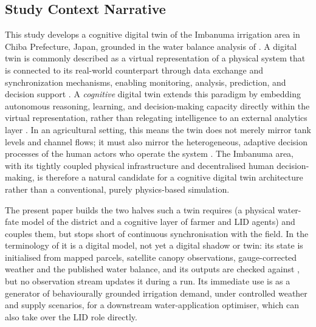 \documentclass{article}
\begin{document}
\subsection{Study Context Narrative}
This study develops a cognitive digital twin of the Imbanuma irrigation area in Chiba Prefecture, Japan, grounded in the water balance analysis of \cite{Okura2025WaterBalance}. A digital twin is commonly described as a virtual representation of a physical system that is connected to its real-world counterpart through data exchange and synchronization mechanisms, enabling monitoring, analysis, prediction, and decision support \cite{Kritzinger2018DigitalTwin, Jones2020DigitalTwin}. A \emph{cognitive} digital twin extends this paradigm by embedding autonomous reasoning, learning, and decision-making capacity directly within the virtual representation, rather than relegating intelligence to an external analytics layer \cite{Tao2019DigitalTwin, Tao2021DigitalTwin, Rasheed2020DigitalTwin, Fuller2020DigitalTwin}. In an agricultural setting, this means the twin does not merely mirror tank levels and channel flows; it must also mirror the heterogeneous, adaptive decision processes of the human actors who operate the system \cite{Verdouw2021AgricultureDT}. The Imbanuma area, with its tightly coupled physical infrastructure and decentralised human decision-making, is therefore a natural candidate for a cognitive digital twin architecture rather than a conventional, purely physics-based simulation.

\begin{added}
The present paper builds the two halves such a twin requires (a physical water-fate model of the district and a cognitive layer of farmer and LID agents) and couples them, but stops short of continuous synchronisation with the field. In the terminology of \cite{Kritzinger2018DigitalTwin} it is a digital model, not yet a digital shadow or twin: its state is initialised from mapped parcels, satellite canopy observations, gauge-corrected weather and the published water balance, and its outputs are checked against \cite{Okura2025WaterBalance}, but no observation stream updates it during a run. Its immediate use is as a generator of behaviourally grounded irrigation demand, under controlled weather and supply scenarios, for a downstream water-application optimiser, which can also take over the LID role directly.
\end{added}
\end{document}
